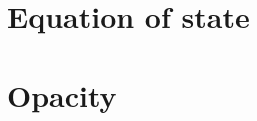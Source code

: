 \documentclass[a4paper,11pt]{report}
\begin{document}
\chapter{Equation of state}

\chapter{Opacity}
\end{document}
